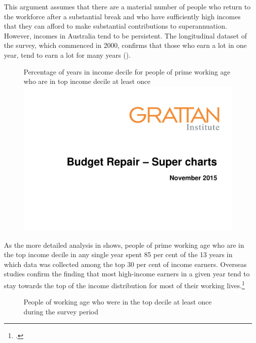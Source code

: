 This argument assumes that there are a material number of people who return to the workforce after a substantial break and who have sufficiently high incomes that they can afford to make substantial contributions to superannuation. However, incomes in Australia tend to be persistent. The longitudinal dataset of the \textcite{HILDA2015} survey, which commenced in 2000, confirms that those who earn a lot in one year, tend to earn a lot for many years ().
\begin{figure}
%
{Percentage of years in income decile for people of prime working age who are in top income decile at least once}\label{fig:SUPER-3-7}
\includegraphics[width=\columnwidth,page=16]{super-atlas/PPTX.pdf}

\end{figure}

As the more detailed analysis in  shows, people of prime working age who are in the top income decile in any single year spent 85 per cent of the 13 years in which data was collected among the top 30 per cent of income earners. Overseas studies confirm the finding that most high-income earners in a given year tend to stay towards the top of the income distribution for most of their working lives.\footcite[][56]{LevellRoantreeShaw2015}  

\begin{figure}
%
{People of working age who were in the top decile at least once during the \textcite{HILDA2015} survey period}\label{fig:SUPER-3-8}
\end{figure}

